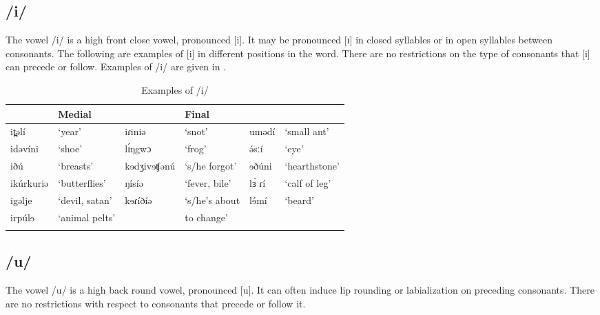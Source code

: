 \subsection{/i/}
The vowel /i/ is a high front close vowel, pronounced [i]. It may be pronounced [ɪ] in closed syllables or in open syllables between consonants. The following are examples of [i] in different positions in the word. There are no restrictions on the type of consonants that [i] can precede or follow. Examples of /i/ are given in .

\begin{table} 
\caption{Examples of /i/}	
 \label{tab:ch2:3}
\begin{tabular}[t]{lp{2cm}lp{2cm}lp{2cm}}
\lsptoprule
\multicolumn{2}{l}{Initial} &  \multicolumn{2}{l}{Medial}	 &	\multicolumn{2}{l}{Final}  \\
\midrule
it̪əlí 	& 	‘year’ 	&  iɾiniə	& ‘snot’ &	umədí   &	‘small ant’\\
idəvíni	& 	‘shoe’	&  lɪ́ŋgwɔ	& ‘frog’ & ə́sːí	& ‘eye’\\
iðú		& ‘breasts’	&  kɘdʒivɘʧənú &	‘s/he forgot’ & ɘðúni	&‘hearthstone’ \\
ikúrkuriə &	‘butterflies’	&  ŋísíə &	‘fever, bile’ & lɜ́ ɾí &	‘calf of leg’\\%
igəlje	& ‘devil, satan’	& 	kɘɾíðíə	&	‘s/he's about &  lɘ́mí &	‘beard’\\
irpúlɘ	& ‘animal pelts’ & & to change’ & & 		\\

\lspbottomrule	
\end{tabular}
\end{table}


		
\subsection{/u/}
The vowel /u/ is a high back round vowel, pronounced [u]. It can often induce lip rounding or labialization on preceding consonants. There are no restrictions with respect to consonants that precede or follow it.

